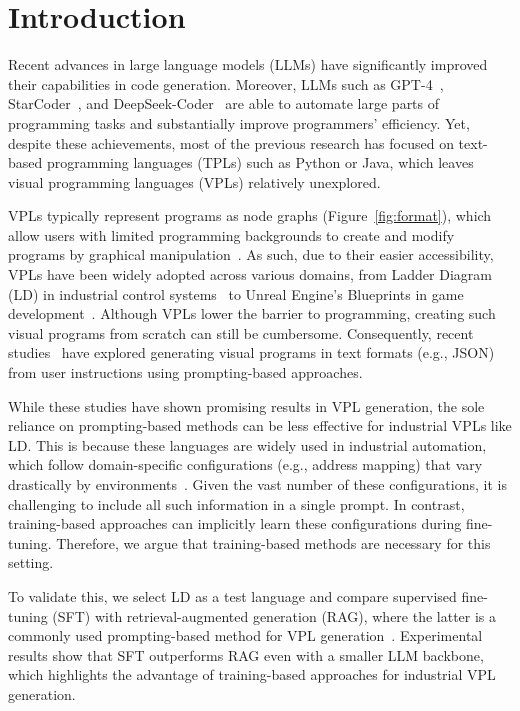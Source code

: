\section{Introduction}
Recent advances in large language models (LLMs) have significantly improved their capabilities in code generation. Moreover, LLMs such as GPT-4~\cite{achiam2023gpt}, StarCoder~\cite{li2023starcodersourceyou}, and DeepSeek-Coder~\cite{guo2024deepseekcoderlargelanguagemodel} are able to automate large parts of programming tasks and substantially improve programmers' efficiency. Yet, despite these achievements, most of the previous research has focused on text-based programming languages (TPLs) such as Python or Java, which leaves visual programming languages (VPLs) relatively unexplored.

VPLs typically represent programs as node graphs (Figure~\ref{fig:format}), which allow users with limited programming backgrounds to create and modify programs by graphical manipulation~\cite{delozier2023using}. As such, due to their easier accessibility, VPLs have been widely adopted across various domains, from Ladder Diagram (LD) in industrial control systems~\cite{IEC61131-3} to Unreal Engine’s Blueprints in game development~\cite{epicgames_blueprints}. Although VPLs lower the barrier to programming, creating such visual programs from scratch can still be cumbersome. Consequently, recent studies~\cite{zhang2024benchmarking,xue2024comfybenchbenchmarkingllmbasedagents,52868} have explored generating visual programs in text formats (e.g., JSON) from user instructions using prompting-based approaches.

While these studies have shown promising results in VPL generation, the sole reliance on prompting-based methods can be less effective for industrial VPLs like LD. This is because these languages are widely used in industrial automation, which follow domain-specific configurations (e.g., address mapping) that vary drastically by environments~\cite{alphonsus2016review}. Given the vast number of these configurations, it is challenging to include all such information in a single prompt. In contrast, training-based approaches can implicitly learn these configurations during fine-tuning. Therefore, we argue that training-based methods are necessary for this setting.

To validate this, we select LD as a test language and compare supervised fine-tuning (SFT) with retrieval-augmented generation (RAG), where the latter is a commonly used prompting-based method for VPL generation~\cite{zhang2024benchmarking,xue2024comfybenchbenchmarkingllmbasedagents}. Experimental results show that SFT outperforms RAG even with a smaller LLM backbone, which highlights the advantage of training-based approaches for industrial VPL generation.

